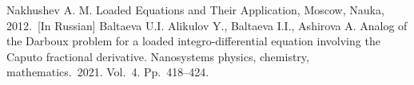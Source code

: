 \documentclass[12pt]{llncs}
\begin{document}
\begin{thebibliography}{9} %
Nakhushev A. M. Loaded Equations and Their Application, Moscow, Nauka, 2012.~[In Russian]
Baltaeva U.I. Alikulov Y., Baltaeva I.I., Ashirova A. Analog of
the Darboux problem for a loaded integro-differential equation involving the Caputo fractional derivative.  Nanosystems physics, chemistry, mathematics.~2021. Vol.~4. Pp.~418--424.
\end{thebibliography}
\end{document}

